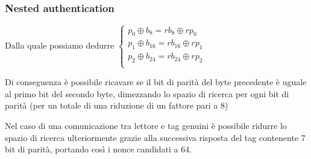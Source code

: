 \begin{frame}
    \frametitle{Nested authentication}
    Dalla quale possiamo dedurre
    \begin{math}
        \begin{cases}
            p_0 \oplus b_8 = rb_8 \oplus rp_0\\
            p_1 \oplus b_{16} = rb_{16} \oplus rp_1\\
            p_2 \oplus b_{24} = rb_{24} \oplus rp_2\\
        \end{cases}
    \end{math}\pause

    Di conseguenza è possibile ricavare se il bit di parità del byte precedente è uguale al primo bit del secondo byte, dimezzando lo spazio di ricerca
    per ogni bit di parità (per un totale di una riduzione di un fattore pari a 8)\pause

    Nel caso di una comunicazione tra lettore e tag genuini è possibile ridurre lo spazio di ricerca ulteriormente grazie alla successiva risposta del tag contenente 7 bit di parità,
    portando così i nonce candidati a 64.
\end{frame}
